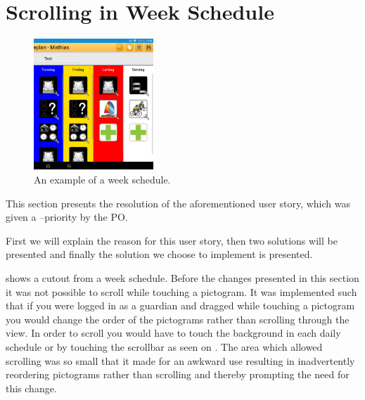 \section{Scrolling in Week Schedule}

\begin{figure}
    \centering
        \includegraphics[width=0.4\textwidth]{figures/img/screenshots/weekplan_schedule.png}
    \caption{An example of a week schedule.}\label{fig:weekschedule}
    \vspace{-20pt}
\end{figure}

This section presents the resolution of the aforementioned user story, which was given a \phigh--priority by the PO.

First we will explain the reason for this user story, then two solutions will be presented and finally the solution we choose to implement is presented.

 shows a cutout from a week schedule.
Before the changes presented in this section it was not possible to scroll while touching a pictogram.
It was implemented such that if you were logged in as a guardian and dragged while touching a pictogram you would change the order of the pictograms rather than scrolling through the view.
In order to scroll you would have to touch the background in each daily schedule or by touching the scrollbar as seen on .
The area which allowed scrolling was so small that it made for an awkward use resulting in inadvertently reordering pictograms rather than scrolling and thereby prompting the need for this change.

